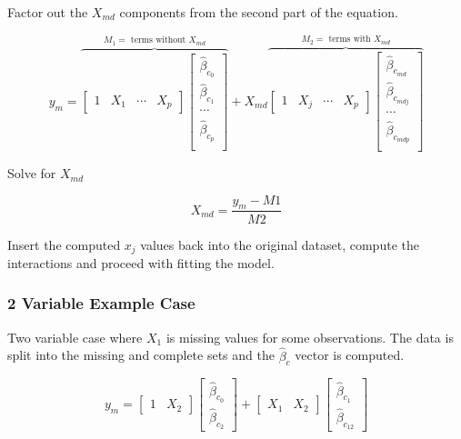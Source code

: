 \documentclass[../../paper.tex]{subfiles}
\begin{document}
Factor out the $X_{md}$ components from the second part of the equation.

\begin{equation}
  y_{m} =
  \overbrace{
  \begin{bmatrix}
    1 & X_{1} & \cdots & X_{p}
  \end{bmatrix}
  \begin{bmatrix}
    \hat{\beta}_{c_0} \\
    \hat{\beta}_{c_1} \\
    \cdots \\
    \hat{\beta}_{c_p} \\
  \end{bmatrix}}^{M_{1} = \text{ terms without } X_{md}} +
  X_{md}
  \overbrace{
  \begin{bmatrix}
    1 & X_{j} & \cdots & X_{p}
  \end{bmatrix}
  \begin{bmatrix}
    \hat{\beta}_{c_{md}} \\
    \hat{\beta}_{c_{mdj}} \\
    \cdots \\
    \hat{\beta}_{c_{mdp}} \\
  \end{bmatrix}}^{M_{2} = \text{ terms with } X_{md}}
\end{equation}

Solve for $X_{md}$

\begin{equation}
X_{md} = \frac{y_{m} - M1}{M2}
\end{equation}

Insert the computed $x_{j}$ values back into the original dataset, compute the interactions and proceed with fitting the model.

\subsubsection*{2 Variable Example Case}
Two variable case where $X_{1}$ is missing values for some observations. The data
is split into the missing and complete sets and the $\hat{\beta}_{c}$ vector is
computed.

\begin{equation}
  y_{m} =
  \begin{bmatrix}
    1 & X_{2}
  \end{bmatrix}
  \begin{bmatrix}
    \hat{\beta}_{c_0} \\
    \hat{\beta}_{c_2}
  \end{bmatrix} +
  \begin{bmatrix}
    X_{1} & X_{2}
  \end{bmatrix}
  \begin{bmatrix}
    \hat{\beta}_{c_1} \\
    \hat{\beta}_{c_{12}}
  \end{bmatrix}
\end{equation}
\end{document}
